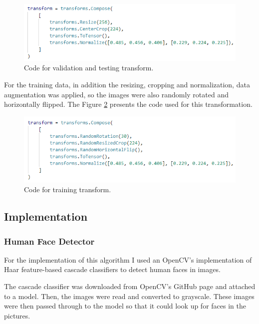 \documentclass{article}
\begin{document}
    \begin{figure}[htbp]
        \centering
        \includegraphics{img/transform_valid_test.png}
        \caption{Code for validation and testing transform.}
        \label{fig:transform_train_test}
    \end{figure}
    
    For the training data, in addition the resizing, cropping and normalization, data augmentation was applied, so the images were also randomly rotated and horizontally flipped. The Figure \ref{fig:transform_train} presents the code used for this transformation.
    
    \begin{figure}[htbp]
        \centering
        \includegraphics{img/transform_train.png}
        \caption{Code for training transform.}
        \label{fig:transform_train}
    \end{figure}

    \subsection{Implementation}

    \subsubsection{Human Face Detector}

    For the implementation of this algorithm I used an OpenCV's implementation of Haar feature-based cascade classifiers to detect human faces in images.

    The cascade classifier was downloaded from OpenCV's GitHub page and attached to a model. Then, the images were read and converted to grayscale. These images were then passed through to the model so that it could look up for faces in the pictures.
\end{document}
